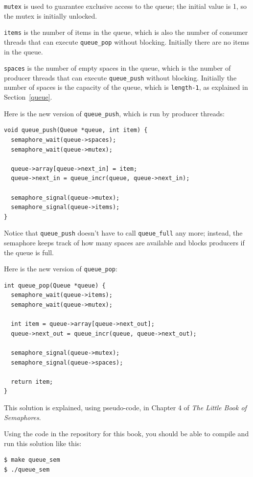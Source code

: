 \documentclass[12pt]{book}
\begin{document}
{{\tt mutex} is used to guarantee exclusive access to the queue;
the initial value is 1, so the mutex is
initially unlocked.

{\tt items} is the number of items in the queue, which is also the number
of consumer threads that can execute \verb"queue_pop" without blocking.
Initially there are no items in the queue.

{\tt spaces} is the number of empty spaces in the queue, which is the
number of producer threads that can execute \verb"queue_push" without
blocking.  Initially the number of spaces is the capacity of the queue,
which is {\tt length-1}, as explained in Section~\ref{queue}.

Here is the new version of \verb"queue_push", which is run by
producer threads:

\begin{verbatim}
void queue_push(Queue *queue, int item) {
  semaphore_wait(queue->spaces);
  semaphore_wait(queue->mutex);

  queue->array[queue->next_in] = item;
  queue->next_in = queue_incr(queue, queue->next_in);

  semaphore_signal(queue->mutex);
  semaphore_signal(queue->items);
}
\end{verbatim}

Notice that \verb"queue_push" doesn't have to call
\verb"queue_full" any more; instead, the semaphore keeps track of
how many spaces are available and blocks producers if the queue
is full.

Here is the new version of \verb"queue_pop":

\begin{verbatim}
int queue_pop(Queue *queue) {
  semaphore_wait(queue->items);
  semaphore_wait(queue->mutex);
  
  int item = queue->array[queue->next_out];
  queue->next_out = queue_incr(queue, queue->next_out);

  semaphore_signal(queue->mutex);
  semaphore_signal(queue->spaces);

  return item;
}
\end{verbatim}

This solution is explained, using pseudo-code, in Chapter 4 of
{\it The Little Book of Semaphores}.

Using the code in the repository for this book, you should be able to compile and run this solution like this:

\begin{verbatim}
$ make queue_sem
$ ./queue_sem
\end{verbatim}



}
\end{document}
